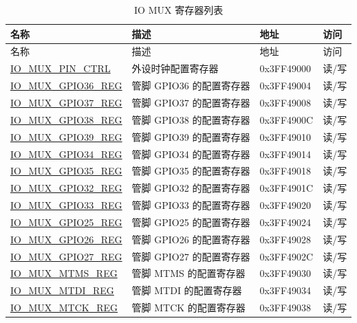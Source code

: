 \begin{longtable}{ | p{5cm} | p{7.5cm} | p{2cm} | p{1cm} | }
\caption{IO MUX 寄存器列表}\label{tab:iomux_reg_list}
\\\hline
\rowcolor{lightgray}
名称 & 描述 &  地址 & 访问 \\ \hline
 \hline
        \endfirsthead
        \hline
        \rowcolor{lightgray}
名称 & 描述 &  地址 & 访问 \\
        \hline
        \endhead
        \endfoot
\hyperref[regdesc:IOMUXPINCTRL]{IO\_MUX\_PIN\_CTRL}&外设时钟配置寄存器 & 0x3FF49000 & 读/写 \\\hline
\hyperref[regdesc:IOMUXnREG]{IO\_MUX\_GPIO36\_REG} & 管脚 GPIO36 的配置寄存器 & 0x3FF49004 &读/写\\ \hline
\hyperref[regdesc:IOMUXnREG]{IO\_MUX\_GPIO37\_REG} & 管脚 GPIO37 的配置寄存器 & 0x3FF49008 & 读/写 \\ \hline
\hyperref[regdesc:IOMUXnREG]{IO\_MUX\_GPIO38\_REG} & 管脚 GPIO38 的配置寄存器 & 0x3FF4900C & 读/写 \\ \hline
\hyperref[regdesc:IOMUXnREG]{IO\_MUX\_GPIO39\_REG} & 管脚 GPIO39 的配置寄存器 & 0x3FF49010 & 读/写 \\ \hline
\hyperref[regdesc:IOMUXnREG]{IO\_MUX\_GPIO34\_REG} & 管脚 GPIO34 的配置寄存器 & 0x3FF49014 & 读/写\\ \hline
\hyperref[regdesc:IOMUXnREG]{IO\_MUX\_GPIO35\_REG} & 管脚 GPIO35 的配置寄存器 & 0x3FF49018 & 读/写 \\ \hline
\hyperref[regdesc:IOMUXnREG]{IO\_MUX\_GPIO32\_REG} & 管脚 GPIO32 的配置寄存器 & 0x3FF4901C &读/写 \\ \hline
\hyperref[regdesc:IOMUXnREG]{IO\_MUX\_GPIO33\_REG} & 管脚 GPIO33 的配置寄存器 & 0x3FF49020 & 读/写 \\ \hline
\hyperref[regdesc:IOMUXnREG]{IO\_MUX\_GPIO25\_REG} & 管脚 GPIO25 的配置寄存器 & 0x3FF49024 & 读/写 \\ \hline 
\hyperref[regdesc:IOMUXnREG]{IO\_MUX\_GPIO26\_REG} & 管脚 GPIO26 的配置寄存器 & 0x3FF49028 & 读/写 \\ \hline
\hyperref[regdesc:IOMUXnREG]{IO\_MUX\_GPIO27\_REG} & 管脚 GPIO27 的配置寄存器 & 0x3FF4902C & 读/写 \\ \hline
\hyperref[regdesc:IOMUXnREG]{IO\_MUX\_MTMS\_REG} & 管脚 MTMS 的配置寄存器 & 0x3FF49030 & 读/写 \\ \hline
\hyperref[regdesc:IOMUXnREG]{IO\_MUX\_MTDI\_REG} & 管脚 MTDI 的配置寄存器 & 0x3FF49034 & 读/写 \\ \hline
\hyperref[regdesc:IOMUXnREG]{IO\_MUX\_MTCK\_REG} & 管脚 MTCK 的配置寄存器 & 0x3FF49038 & 读/写 \\ \hline

\end{longtable}
